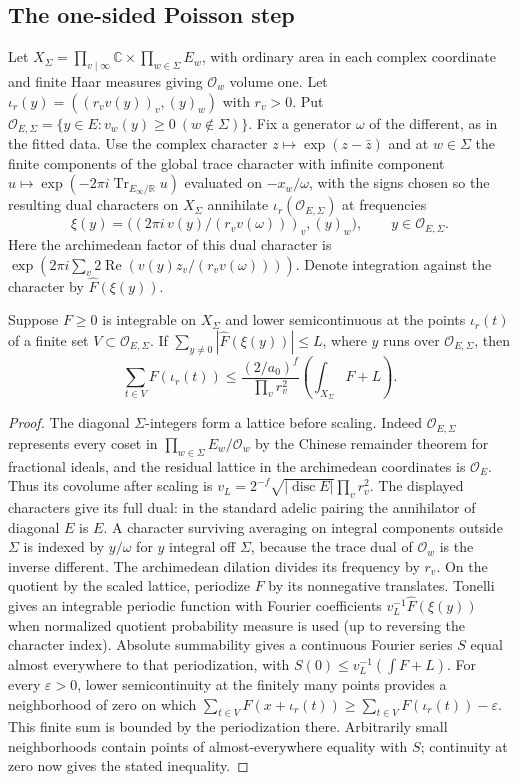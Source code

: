 \subsection*{The one-sided Poisson step}
Let $X_\Sigma=\prod_{v\mid\infty}\mathbb C\times\prod_{w\in \Sigma}E_w$, with ordinary area in each complex coordinate and finite Haar measures giving $\mathcal O_w$ volume one. Let $\iota_r(y)=((r_v v(y))_v,(y)_w)$ with $r_v>0$. Put $\mathcal O_{E,\Sigma}=\{y\in E:v_w(y)\ge0\ (w\notin \Sigma)\}$. Fix a generator $\omega$ of the different, as in the fitted data. Use the complex character $z\mapsto\exp(z-\bar z)$ and at $w\in \Sigma$ the finite components of the global trace character with infinite component $u\mapsto\exp(-2\pi i\operatorname{Tr}_{E_\infty/\mathbb R}u)$ evaluated on $-x_w/\omega$, with the signs chosen so the resulting dual characters on $X_\Sigma$ annihilate $\iota_r(\mathcal O_{E,\Sigma})$ at frequencies
\[
 \xi(y)=\big((2\pi i\,v(y)/(r_v v(\omega)))_v,(y)_w\big),\qquad y\in\mathcal O_{E,\Sigma}.
\]
Here the archimedean factor of this dual character is $\exp(2\pi i\sum_v2\operatorname{Re}(v(y)z_v/(r_vv(\omega))))$. Denote integration against the character by $\widehat F(\xi(y))$.
\begin{lemma}
Suppose $F\ge0$ is integrable on $X_\Sigma$ and lower semicontinuous at the points $\iota_r(t)$ of a finite set $V\subset\mathcal O_{E,\Sigma}$. If $\sum_{y\ne0}|\widehat F(\xi(y))|\le L$, where $y$ runs over $\mathcal O_{E,\Sigma}$, then
\[
 \sum_{t\in V}F(\iota_r(t))
 \le \frac{(2/a_0)^f}{\prod_v r_v^2}
 \left(\int_{X_\Sigma}F+L\right).
\]
\end{lemma}
\begin{proof}
The diagonal $\Sigma$-integers form a lattice before scaling. Indeed $\mathcal O_{E,\Sigma}$ represents every coset in $\prod_{w\in \Sigma} E_w/\mathcal O_w$ by the Chinese remainder theorem for fractional ideals, and the residual lattice in the archimedean coordinates is $\mathcal O_E$. Thus its covolume after scaling is $v_L=2^{-f}\sqrt{|\operatorname{disc}E|}\prod_vr_v^2$. The displayed characters give its full dual: in the standard adelic pairing the annihilator of diagonal $E$ is $E$. A character surviving averaging on integral components outside $\Sigma$ is indexed by $y/\omega$ for $y$ integral off $\Sigma$, because the trace dual of $\mathcal O_w$ is the inverse different. The archimedean dilation divides its frequency by $r_v$.
On the quotient by the scaled lattice, periodize $F$ by its nonnegative translates. Tonelli gives an integrable periodic function with Fourier coefficients $v_L^{-1}\widehat F(\xi(y))$ when normalized quotient probability measure is used (up to reversing the character index). Absolute summability gives a continuous Fourier series $S$ equal almost everywhere to that periodization, with $S(0)\le v_L^{-1}(\int F+L)$. For every $\varepsilon>0$, lower semicontinuity at the finitely many points provides a neighborhood of zero on which $\sum_{t\in V} F(x+\iota_r(t))\ge\sum_{t\in V} F(\iota_r(t))-\varepsilon$. This finite sum is bounded by the periodization there. Arbitrarily small neighborhoods contain points of almost-everywhere equality with $S$; continuity at zero now gives the stated inequality.
\end{proof}
